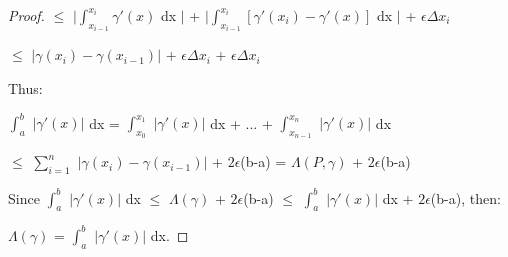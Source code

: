 \begin{proof}
        \hspace{3.3cm}
        $\leq$ $|\int_{x_{i-1}}^{x_i} \gamma'(x)$ dx $|$
                + $|\int_{x_{i-1}}^{x_i} [\gamma'(x_i) - \gamma'(x)]$ dx $|$
                + $\epsilon \Delta x_i$

        \hspace{3.3cm}
        $\leq$ $|\gamma(x_i) - \gamma(x_{i-1})|$
            + $\epsilon \Delta x_i$
            + $\epsilon \Delta x_i$

        Thus:

        \hspace{0.5cm}
        $\int_a^b$ $|\gamma'(x)|$ dx
        = $\int_{x_0}^{x_1}$ $|\gamma'(x)|$ dx
            + ... + $\int_{x_{n-1}}^{x_n}$ $|\gamma'(x)|$ dx

        \hspace{2.9cm}
        $\leq$ $\sum_{i=1}^n$ $|\gamma(x_i) - \gamma(x_{i-1})|$ + $2\epsilon$(b-a)
        = $\Lambda(P,\gamma)$ + $2\epsilon$(b-a)

        Since
        $\int_a^b$ $|\gamma'(x)|$ dx
        $\leq$ $\Lambda(\gamma)$ + $2\epsilon$(b-a)
        $\leq$ $\int_a^b$ $|\gamma'(x)|$ dx + $2\epsilon$(b-a),
        then:
        
        \hspace{0.5cm}
        $\Lambda(\gamma)$ = $\int_a^b$ $|\gamma'(x)|$ dx.        
    \end{proof}















